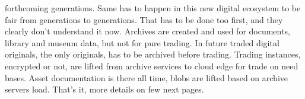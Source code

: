forthcoming generations. Same has to happen in this new digital ecosystem to be fair from generations to generations. That has to be done too first, and they clearly don't understand it now. Archives are created and used for documents, library and museum data, but not for pure trading. In future traded digital originals, the only originals, has to be archived before trading. Trading instances, encrypted or not, are lifted from archive services to cloud edge for trade on need bases. Asset documentation is there all time, blobs are lifted based on archive servers load. That's it, more details on few next pages.
